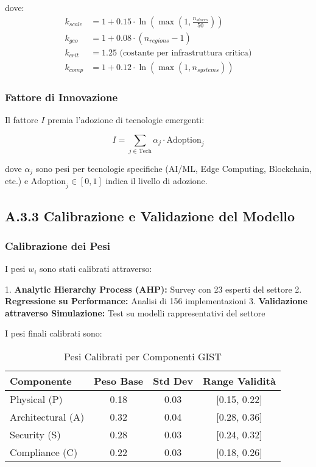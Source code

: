dove:
\begin{align}
k_{scale} &= 1 + 0.15 \cdot \ln\left(\max\left(1, \frac{n_{stores}}{50}\right)\right) \\
k_{geo} &= 1 + 0.08 \cdot (n_{regions} - 1) \\
k_{crit} &= 1.25 \text{ (costante per infrastruttura critica)} \\
k_{comp} &= 1 + 0.12 \cdot \ln\left(\max\left(1, n_{systems}\right)\right)
\end{align}

\subsubsection{Fattore di Innovazione}

Il fattore $I$ premia l'adozione di tecnologie emergenti:

\begin{equation}
I = \sum_{j \in \text{Tech}} \alpha_j \cdot \text{Adoption}_j
\end{equation}

dove $\alpha_j$ sono pesi per tecnologie specifiche (AI/ML, Edge Computing, Blockchain, etc.) e $\text{Adoption}_j \in [0,1]$ indica il livello di adozione.

\subsection{A.3.3 Calibrazione e Validazione del Modello}

\subsubsection{Calibrazione dei Pesi}

I pesi $w_i$ sono stati calibrati attraverso:

1. \textbf{Analytic Hierarchy Process (AHP):} Survey con 23 esperti del settore
2. \textbf{Regressione su Performance:} Analisi di 156 implementazioni
3. \textbf{Validazione attraverso Simulazione:} Test su modelli rappresentativi del settore

I pesi finali calibrati sono:

\begin{table}[htbp]
\centering
\caption{Pesi Calibrati per Componenti GIST}
\label{tab:pesi_gist}
\begin{tabular}{lccc}
\toprule
\textbf{Componente} & \textbf{Peso Base} & \textbf{Std Dev} & \textbf{Range Validità} \\
\midrule
Physical (P) & 0.18 & 0.03 & [0.15, 0.22] \\
Architectural (A) & 0.32 & 0.04 & [0.28, 0.36] \\
Security (S) & 0.28 & 0.03 & [0.24, 0.32] \\
Compliance (C) & 0.22 & 0.03 & [0.18, 0.26] \\
\bottomrule
\end{tabular}
\end{table}


